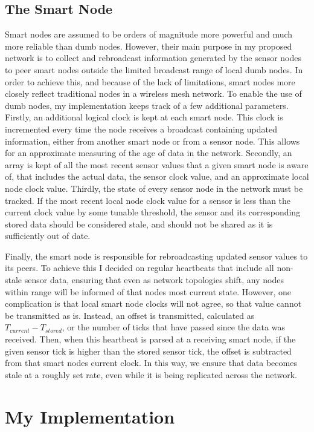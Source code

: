 \documentclass{article}
\begin{document}
\subsection{The Smart Node}

Smart nodes are assumed to be orders of magnitude more powerful and much more reliable than dumb nodes. However, their main purpose in my proposed network is to collect and rebroadcast information generated by the sensor nodes to peer smart nodes outside the limited broadcast range of local dumb nodes. In order to achieve this, and because of the lack of limitations, smart nodes more closely reflect traditional nodes in a wireless mesh network. To enable the use of dumb nodes, my implementation keeps track of a few additional parameters.
Firstly, an additional logical clock is kept at each smart node. This clock is incremented every time the node receives a broadcast containing updated information, either from another smart node or from a sensor node. This allows for an approximate measuring of the age of data in the network.
Secondly, an array is kept of all the most recent sensor values that a given smart node is aware of, that includes the actual data, the sensor clock value, and an approximate local node clock value.
Thirdly, the state of every sensor node in the network must be tracked. If the most recent local node clock value for a sensor is less than the current clock value by some tunable threshold, the sensor and its corresponding stored data should be considered stale, and should not be shared as it is sufficiently out of date.

Finally, the smart node is responsible for rebroadcasting updated sensor values to its peers. To achieve this I decided on regular heartbeats that include all non-stale sensor data, ensuring that even as network topologies shift, any nodes within range will be informed of that nodes most current state. However, one complication is that local smart node clocks will not agree, so that value cannot be transmitted as is. Instead, an offset is transmitted, calculated as $T_{current} - T_{stored}$, or the number of ticks that have passed since the data was received. Then, when this heartbeat is parsed at a receiving smart node, if the given sensor tick is higher than the stored sensor tick, the offset is subtracted from that smart nodes current clock. In this way, we ensure that data becomes stale at a roughly set rate, even while it is being replicated across the network.



\section{My Implementation}
\end{document}
